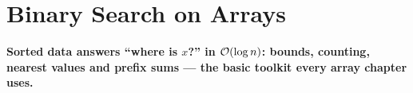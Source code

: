 \chapter{Binary Search on Arrays}
\label{ch:binary_search}

\begin{tcolorbox}[enhanced, colback=white, colframe=secondaryblue, boxrule=1pt, arc=2mm]
\textbf{\large\textcolor{primaryblue}{Sorted data answers ``where is $x$?'' in $\mathcal{O}(\log n)$: bounds, counting, nearest values and prefix sums --- the basic toolkit every array chapter uses.}}
\end{tcolorbox}


